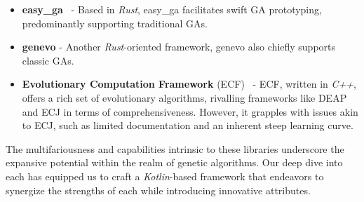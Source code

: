 \begin{itemize}
    \item \textbf{easy\_ga}~\autocite{EasyGaSrc} - 
      Based in \textit{Rust}, easy\_ga facilitates swift GA prototyping, 
      predominantly supporting traditional GAs.
    \item \textbf{genevo}\autocite{GenevoRust} -
      Another \textit{Rust}-oriented framework, genevo also chiefly supports classic GAs.
    \item \textbf{Evolutionary Computation Framework} (ECF)~\autocite{djakobovicECFEvolutionaryComputation2023} - 
      ECF, written in \textit{C++}, offers a rich set of evolutionary 
      algorithms, rivalling frameworks like DEAP and ECJ in terms of 
      comprehensiveness.
      However, it grapples with issues akin to ECJ, such as limited 
      documentation and an inherent steep learning curve.
  \end{itemize}

  The multifariousness and capabilities intrinsic to these libraries underscore 
  the expansive potential within the realm of genetic algorithms.
  Our deep dive into each has equipped us to craft a \textit{Kotlin}-based 
  framework that endeavors to synergize the strengths of each while introducing 
  innovative attributes.
